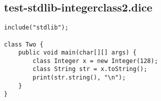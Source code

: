 \subsection{test-stdlib-integerclass2.dice}
\begin{verbatim}
include("stdlib");

class Two {
	public void main(char[][] args) {
        class Integer x = new Integer(128);
        class String str = x.toString();
        print(str.string(), "\n");
	}
}

\end{verbatim}